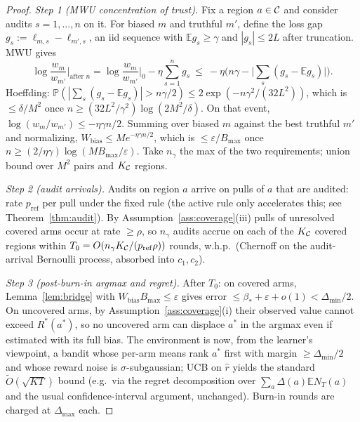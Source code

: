 \documentclass[11pt]{article}
\theoremstyle{definition}\newtheorem{definition}{Definition}
\theoremstyle{definition}\newtheorem{assumption}{Assumption}
\newcommand{\Rstar}{R^{\ast}}\newcommand{\astar}{a^{\ast}}
\newcommand{\E}{\mathbb{E}}\newcommand{\Prob}{\mathbb{P}}
\begin{document}
\begin{proof}
\emph{Step 1 (MWU concentration of trust).}
Fix a region $a\in\mathcal{C}$ and consider audits $s=1,\dots,n$ on it. For biased $m$
and truthful $m'$, define the loss gap $g_s:=\ell_{m,s}-\ell_{m',s}$, an iid
sequence with $\E g_s\ge\gamma$ and $|g_s|\le 2L$ after truncation. MWU gives
\[
\log\frac{w_m}{w_{m'}}\Big|_{\text{after }n}
=\log\frac{w_m}{w_{m'}}\Big|_{0}-\eta\sum_{s=1}^{n}g_s
\ \le\ -\eta\Big(n\gamma-\big|\textstyle\sum_s (g_s-\E g_s)\big|\Big).
\]
Hoeffding: $\Prob(|\sum_s(g_s-\E g_s)|>n\gamma/2)\le
2\exp(-n\gamma^{2}/(32L^{2}))$, which is $\le\delta/M^2$ once
$n\ge (32L^2/\gamma^2)\log(2M^2/\delta)$. On that event,
$\log(w_m/w_{m'})\le-\eta\gamma n/2$. Summing over biased $m$ against the best
truthful $m'$ and normalizing,
$W_{\mathrm{bias}}\le M e^{-\eta\gamma n/2}$, which is $\le\varepsilon/B_{\max}$
once $n\ge (2/\eta\gamma)\log(MB_{\max}/\varepsilon)$. Take $n_\gamma$ the max of
the two requirements; union bound over $M^2$ pairs and $K_{\mathcal{C}}$ regions.

\emph{Step 2 (audit arrivals).} Audits on region $a$ arrive on pulls of $a$ that
are audited: rate $p_{\mathrm{ref}}$ per pull under the fixed rule (the active
rule only accelerates this; see Theorem~\ref{thm:audit}). By
Assumption~\ref{ass:coverage}(iii) pulls of unresolved covered arms occur at rate
$\ge\rho$, so $n_\gamma$ audits accrue on each of the $K_{\mathcal{C}}$ covered regions
within $T_0=O(n_\gamma K_{\mathcal{C}}/(p_{\mathrm{ref}}\rho))$ rounds, w.h.p.\ (Chernoff
on the audit-arrival Bernoulli process, absorbed into $c_1,c_2$).

\emph{Step 3 (post-burn-in argmax and regret).}
After $T_0$: on covered arms, Lemma~\ref{lem:bridge} with
$W_{\mathrm{bias}}B_{\max}\le\varepsilon$ gives error
$\le\beta_\ast+\varepsilon+o(1)<\Delta_{\min}/2$. On uncovered arms, by
Assumption~\ref{ass:coverage}(i) their observed value cannot exceed
$\Rstar(\astar)$, so no uncovered arm can displace $\astar$ in the argmax even if
estimated with its full bias. The environment is now, from the learner's
viewpoint, a bandit whose per-arm means rank $\astar$ first with margin
$\ge\Delta_{\min}/2$ and whose reward noise is $\sigma$-subgaussian; UCB on
$\hat r$ yields the standard $\tilde O(\sqrt{KT})$ bound (e.g.\ via the
regret decomposition over $\sum_a \Delta(a)\E N_T(a)$ and the usual
confidence-interval argument, unchanged). Burn-in rounds are charged at
$\Delta_{\max}$ each.
\end{proof}

\end{document}
